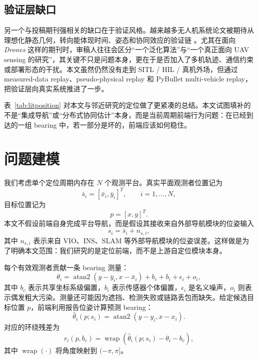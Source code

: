 \documentclass[drones,article,submit,moreauthors]{Definitions/mdpi}
\begin{document}
\subsection{验证层缺口}

另一个与投稿期刊强相关的缺口在于验证风格。越来越多无人机系统论文被期待从理想化静态几何，转向能体现时间、姿态和协同效应的验证链 \cite{panerati2021learning,perezsegui2023bridging}。尤其在面向 \textit{Drones} 这样的期刊时，审稿人往往会区分“一个泛化算法”与“一个真正面向 UAV sensing 的研究”，其关键不只是问题本身，更在于是否加入了多机轨迹、通信约束或部署形态的干扰。本文虽然仍然没有走到 SITL / HIL / 真机外场，但通过 measured-data replay、pseudo-physical replay 和 PyBullet multi-vehicle replay，把验证层向真实系统推进了一步。

表~\ref{tab:litposition} 对本文与邻近研究的定位做了更紧凑的总结。本文试图填补的不是“集成导航”或“分布式协同估计”本身，而是当前周期前端行为问题：在已经到达的一组 bearing 中，若一部分是坏的，前端应该如何稳住。



\section{问题建模}

我们考虑单个定位周期内存在 $N$ 个观测平台。真实平面观测者位置记为
\begin{equation}
\bar{s}_i = [\bar{x}_i,\bar{y}_i]^T,\qquad i=1,\dots,N,
\end{equation}
目标位置记为
\begin{equation}
p = [x,y]^T.
\end{equation}
本文不假设前端自身完成平台导航，而是假设其接收来自外部导航模块的位姿输入
\begin{equation}
s_i = \bar{s}_i + n_{s,i},
\end{equation}
其中 $n_{s,i}$ 表示来自 VIO、INS、SLAM 等外部导航模块的位姿误差。这样做是为了明确本文范围：我们研究的是定位前端，而不是上游自定位模块本身。

每个有效观测者贡献一条 bearing 测量：
\begin{equation}
\theta_i = \operatorname{atan2}(y-\bar{y}_i, x-\bar{x}_i) + b_c + b_i + \epsilon_i + o_i,
\end{equation}
其中 $b_c$ 表示共享坐标系级偏置，$b_i$ 表示传感器个体偏置，$\epsilon_i$ 是名义噪声，$o_i$ 则表示偶发粗大污染。测量还可能因为遮挡、检测失败或链路丢包而缺失。给定候选目标位置 $p$，前端利用报告位姿计算预测 bearing：
\begin{equation}
\hat{\theta}_i(p;s_i)=\operatorname{atan2}(y-y_i,x-x_i).
\end{equation}
对应的环绕残差为
\begin{equation}
r_i(p,b_c)=\operatorname{wrap}\!\left(\hat{\theta}_i(p;s_i)-\theta_i-b_c\right),
\end{equation}
其中 $\operatorname{wrap}(\cdot)$ 将角度映射到 $(-\pi,\pi]$。
\end{document}
